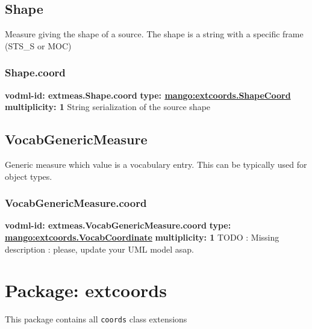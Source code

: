   \subsection{Shape}
  \label{sect:extmeas.Shape}
    Measure giving the shape of a source. The shape is a string with a specific frame (STS\_S or MOC)

    \subsubsection{Shape.coord}
      \textbf{vodml-id: extmeas.Shape.coord} \newline
      \textbf{type: \hyperref[sect:extcoords.ShapeCoord]{mango:extcoords.ShapeCoord}} \newline
      \textbf{multiplicity: 1} \newline 
      String serialization of the source shape

  \subsection{VocabGenericMeasure}
  \label{sect:extmeas.VocabGenericMeasure}
    Generic measure which value is a vocabulary entry. This can be typically used for object types.

    \subsubsection{VocabGenericMeasure.coord}
      \textbf{vodml-id: extmeas.VocabGenericMeasure.coord} \newline
      \textbf{type: \hyperref[sect:extcoords.VocabCoordinate]{mango:extcoords.VocabCoordinate}} \newline
      \textbf{multiplicity: 1} \newline 
      TODO : Missing description : please, update your UML model asap.

\pagebreak
\section{Package: extcoords }


  This package contains all \texttt{coords} class extensions

